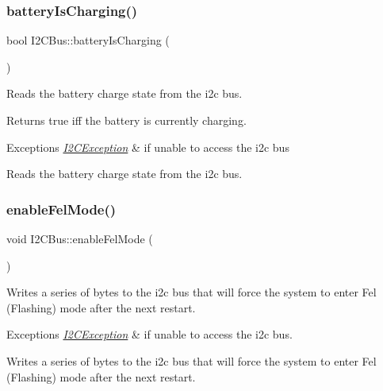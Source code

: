 \subsubsection{\texorpdfstring{battery\+Is\+Charging()}{batteryIsCharging()}}
{\footnotesize\ttfamily bool I2\+C\+Bus\+::battery\+Is\+Charging (\begin{DoxyParamCaption}{ }\end{DoxyParamCaption})}

Reads the battery charge state from the i2c bus.

\begin{DoxyReturn}{Returns}
true iff the battery is currently charging.
\end{DoxyReturn}

\begin{DoxyExceptions}{Exceptions}
{\em \mbox{\hyperlink{structI2CBus_1_1I2CException}{I2\+C\+Exception}}} & if unable to access the i2c bus\\
\hline
\end{DoxyExceptions}
Reads the battery charge state from the i2c bus. \mbox{\label{classI2CBus_ac92bf5730bad62c9118e47eac2f8f69a}} 
\subsubsection{\texorpdfstring{enable\+Fel\+Mode()}{enableFelMode()}}
{\footnotesize\ttfamily void I2\+C\+Bus\+::enable\+Fel\+Mode (\begin{DoxyParamCaption}{ }\end{DoxyParamCaption})}

Writes a series of bytes to the i2c bus that will force the system to enter Fel (Flashing) mode after the next restart.


\begin{DoxyExceptions}{Exceptions}
{\em \mbox{\hyperlink{structI2CBus_1_1I2CException}{I2\+C\+Exception}}} & if unable to access the i2c bus.\\
\hline
\end{DoxyExceptions}
Writes a series of bytes to the i2c bus that will force the system to enter Fel (Flashing) mode after the next restart. \mbox{\label{classI2CBus_a963f9df4208f99c796cede0552ca83ba}} 
